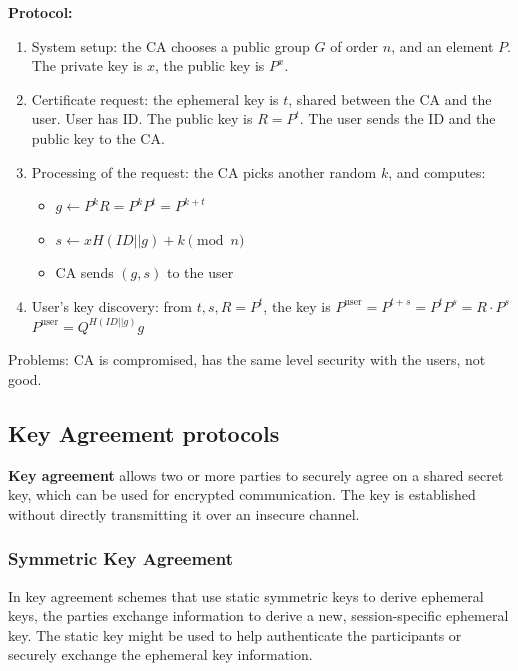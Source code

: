 \textbf{Protocol:}
\begin{enumerate}
    \item System setup: the CA chooses a public group $G$ of order $n$, and an element $P$. 
    The private key is $x$, the public key is $P^x$.

    \item Certificate request: the ephemeral key is $t$, shared between the CA and the user. User has ID. 
    The public key is $R=P^t$. The user sends the ID and the public key to the CA.

    \item Processing of the request: the CA picks another random $k$, and computes:
    \begin{itemize}
        \item $g \leftarrow P^kR = P^kP^t = P^{k+t}$
        
        \item $s \leftarrow x H(ID||g) + k \pmod{n}$
        
        \item CA sends $(g,s)$ to the user
    \end{itemize}


    \item User's key discovery: from $t, s, R = P^t$, the key is $P^{\text{user}} = P^{t+s} = P^tP^s = R \cdot P^s$ \\
    $P^{\text{user}} = Q^{H(ID||g)}g$

\end{enumerate}

Problems: CA is compromised, has the same level security with the users, not good.

\subsection{Key Agreement protocols}

\textbf{Key agreement} allows two or more parties to securely agree on a shared secret key, 
which can be used for encrypted communication. 
The key is established without directly transmitting it over an insecure channel.

\subsubsection{Symmetric Key Agreement}
In key agreement schemes that use static symmetric keys to derive ephemeral keys, 
the parties exchange information to derive a new, session-specific ephemeral key. 
The static key might be used to help authenticate the participants or securely exchange the ephemeral key information. \\

